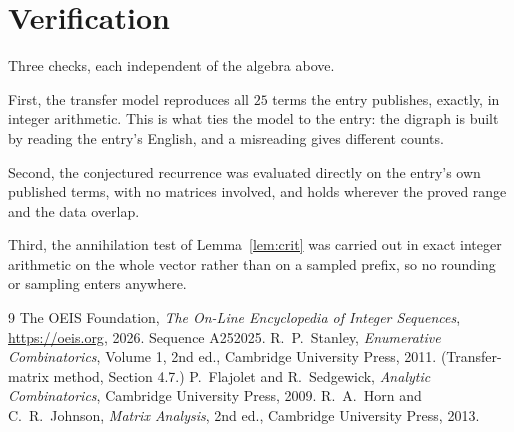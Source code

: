 \documentclass[11pt,a4paper]{article}
\theoremstyle{plain}
\theoremstyle{definition}
\begin{document}
\section{Verification}

Three checks, each independent of the algebra above.

First, the transfer model reproduces all $25$ terms the entry publishes, exactly, in
integer arithmetic. This is what ties the model to the entry: the digraph is built by reading
the entry's English, and a misreading gives different counts.

Second, the conjectured recurrence was evaluated directly on the entry's own published terms,
with no matrices involved, and holds wherever the proved range and the data overlap.

Third, the annihilation test of Lemma~\ref{lem:crit} was carried out in exact integer
arithmetic on the whole vector rather than on a sampled prefix, so no rounding or sampling
enters anywhere.

\begin{thebibliography}{9}
 The OEIS Foundation, \emph{The On-Line Encyclopedia of Integer
Sequences}, \url{https://oeis.org}, 2026. Sequence A252025.
 R.~P.~Stanley, \emph{Enumerative Combinatorics}, Volume 1, 2nd ed.,
Cambridge University Press, 2011. (Transfer-matrix method, Section 4.7.)
 P.~Flajolet and R.~Sedgewick, \emph{Analytic Combinatorics}, Cambridge
University Press, 2009.
 R.~A.~Horn and C.~R.~Johnson, \emph{Matrix Analysis}, 2nd ed., Cambridge
University Press, 2013.
\end{thebibliography}
\end{document}
